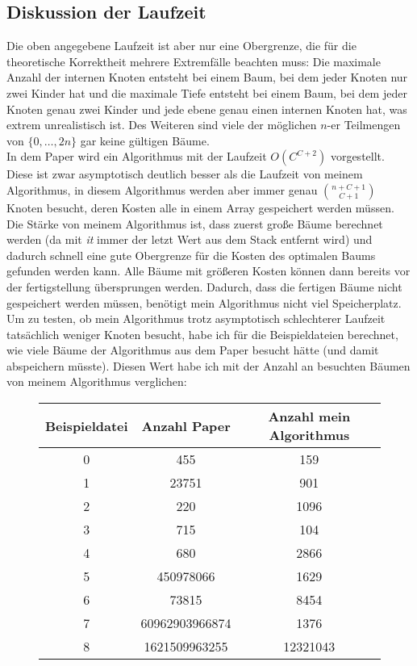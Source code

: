 \documentclass[a4paper,10pt,ngerman]{scrartcl}
\begin{document}
    \subsection{Diskussion der Laufzeit}
    Die oben angegebene Laufzeit ist aber nur eine Obergrenze, die für die theoretische Korrektheit mehrere Extremfälle beachten muss:
    Die maximale Anzahl der internen Knoten entsteht bei einem Baum, bei dem jeder Knoten nur zwei Kinder hat und die maximale Tiefe entsteht bei einem Baum, bei dem jeder Knoten genau zwei Kinder und jede ebene genau einen internen Knoten hat, was extrem unrealistisch ist.
    Des Weiteren sind viele der möglichen $n$-er Teilmengen von $\{0, \dots, 2n\}$ gar keine gültigen Bäume. \\
    In dem Paper\autocite{golin_dynamic_1998} wird ein Algorithmus mit der Laufzeit $O(C^{C+2})$ vorgestellt.
    Diese ist zwar asymptotisch deutlich besser als die Laufzeit von meinem Algorithmus, in diesem Algorithmus werden aber
    immer genau ${n + C + 1}\choose {C+ 1}$ Knoten besucht, deren Kosten alle in einem Array gespeichert werden müssen.
    Die Stärke von meinem Algorithmus ist, dass zuerst große Bäume berechnet werden (da mit \textit{it} immer der letzt Wert aus dem Stack entfernt wird) und dadurch schnell eine gute Obergrenze für die Kosten des optimalen Baums gefunden werden kann.
    Alle Bäume mit größeren Kosten können dann bereits vor der fertigstellung übersprungen werden.
    Dadurch, dass die fertigen Bäume nicht gespeichert werden müssen, benötigt mein Algorithmus nicht viel Speicherplatz.
    Um zu testen, ob mein Algorithmus trotz asymptotisch schlechterer Laufzeit tatsächlich weniger Knoten besucht, habe
    ich für die Beispieldateien berechnet, wie viele Bäume der Algorithmus aus dem Paper besucht hätte (und damit abspeichern müsste).
    Diesen Wert habe ich mit der Anzahl an besuchten Bäumen von meinem Algorithmus verglichen:
    \begin{figure}[H]
        \centering
        \begin{tabular}{c |c | c}
            Beispieldatei & Anzahl Paper   & Anzahl mein Algorithmus \\
            \hline
            0             & 455            & 159                     \\
            1             & 23751          & 901                     \\
            2             & 220            & 1096                    \\
            3             & 715            & 104                     \\
            4             & 680            & 2866                    \\
            5             & 450978066      & 1629                    \\
            6             & 73815          & 8454                    \\
            7             & 60962903966874 & 1376                    \\
            8             & 1621509963255  & 12321043                \\
        \end{tabular}
    \end{figure}
\end{document}
